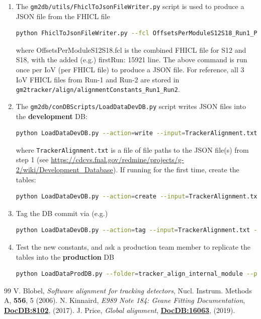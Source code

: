 \documentclass[12pt]{article}
\begin{document}
\begin{enumerate}
    \item The \verb!gm2db/utils/FhiclToJsonFileWriter.py! script is used to produce a JSON file from the FHICL file
     \begin{lstlisting}[language=bash]
     python FhiclToJsonFileWriter.py --fcl OffsetsPerModuleS12S18_Run1_Period_1_of_1_15921.fcl --ana tracker_align_internal_module --iov run --path tracker_align_internal_module_json/ --file tracker_align_internal_module \end{lstlisting}

     where OffsetsPerModuleS12S18.fcl is the combined FHICL file for S12 and S18, with the added (e.g.) firstRun: 15921 line. The above command is run once per IoV (per FHICL file) to produce a JSON file. For reference, all 3 IoV FHICL files from Run-1 and Run-2 are stored in \verb!gm2tracker/align/alignmentConstants_Run1_Run2!.
     \item The \verb!gm2db/conDBScripts/LoadDataDevDB.py! script writes JSON files into the \textbf{development} DB:
      \begin{lstlisting}[language=bash]
      python LoadDataDevDB.py --action=write --input=TrackerAlignment.txt\end{lstlisting}
      where \verb!TrackerAlignment.txt! is a file of file paths to the JSON file(s) from step 1 (see \url{https://cdcvs.fnal.gov/redmine/projects/g-2/wiki/Development_Database}).
      If running for the first time, create the tables:
       \begin{lstlisting}[language=bash]
       python LoadDataDevDB.py --action=create --input=TrackerAlignment.txt \end{lstlisting}
       \item Tag the DB commit via (e.g.)
       \begin{lstlisting}[language=bash]
       python LoadDataDevDB.py --action=tag --input=TrackerAlignment.txt --tag=v2 \end{lstlisting}
       \item Test the new constants, and ask a production team member to replicate the tables into the \textbf{production} DB
        \begin{lstlisting}[language=bash]
        python LoadDataProdDB.py --folder=tracker_align_internal_module --prodTag v2 --devTag v2 \end{lstlisting}
\end{enumerate}

\begin{thebibliography}{99}
\footnotesize
{} V. Blobel, \textit{Software alignment for tracking detectors}, Nucl. Instrum. Methods A, \textbf{556}, 5 (2006).
 N. Kinnaird, \textit{E989 Note 184: Geane Fitting Documentation}, \textbf{\href{https://gm2-docdb.fnal.gov/cgi-bin/private/ShowDocument?docid=8102}{DocDB:8102}}, (2017).
 J. Price, \textit{Global alignment}, \textbf{\href{https://gm2-docdb.fnal.gov/cgi-bin/private/ShowDocument?docid=16063}{DocDB:16063}}, (2019).


\end{thebibliography}
\end{document}
